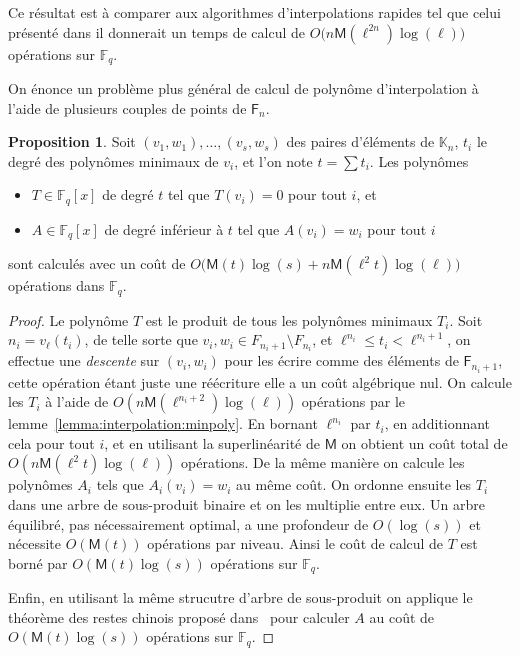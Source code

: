\documentclass[10pt,a4paper]{book}
\theoremstyle{plain}
\theoremstyle{definition}
\theoremstyle{definition}
\theoremstyle{definition}
\newtheorem{prop}[thm]{Proposition}
\theoremstyle{definition}
\theoremstyle{remark}
\theoremstyle{remark}
\theoremstyle{definition}
\begin{document}
 
 Ce résultat est à comparer aux algorithmes d'interpolations rapides 
 tel que  celui présenté dans \cite[Chapter~10.2]{vzGJG03} il donnerait un temps
 de calcul de  $O\bigl(n\mathsf{M}(\ell^{2n})\log(\ell)\bigr)$ opérations sur 
 $\mathbb{F}_q$. 

On énonce un problème plus général de calcul de polynôme d'interpolation 
à l'aide de plusieurs couples de points de $\mathsf{F}_n$.

\begin{prop}\label{prop:interpol}
  Soit $(v_1,w_1),\dots,(v_s,w_s)$ des paires d'éléments de $\mathbb{K}_n$, 
  $t_i$ le degré des polynômes minimaux de $v_i$, et l'on note  $t=\sum t_i$. 
  Les polynômes
  \begin{itemize}
  \item $T\in \mathbb{F}_q[x]$ de degré $t$ tel que $T(v_i)=0$ pour tout $i$,
    et
  \item $A\in \mathbb{F}_q[x]$ de degré inférieur à $t$ tel que $A(v_i)=w_i$ pour
    tout $i$
  \end{itemize}
  sont calculés avec un coût de
  $O\bigl(\mathsf{M}(t)\log(s) + n\mathsf{M}(\ell^2t)\log(\ell)\bigr)$ opérations dans $\mathbb{F}_q$.
\end{prop}
\begin{proof}
  Le polynôme $T$ est le produit de tous les polynômes minimaux $T_i$. Soit 
  $n_i=v_\ell(t_i)$, de telle sorte que $v_i,w_i\in F_{n_i+1}\setminus F_{n_i}$,
  et $\ell^{n_i}\leqslant t_i<\ell^{n_i+1}$,
  on effectue une \emph{descente} sur $(v_i,w_i)$ pour les écrire comme des 
  éléments de $\mathsf{F}_{n_i+1}$, cette opération étant juste une réécriture
  elle a un coût algébrique nul. On calcule les $T_i$ à l'aide de
   $O(n\mathsf{M}(\ell^{n_i+2})\log(\ell))$ opérations par 
   le lemme~\ref{lemma:interpolation:minpoly}. En bornant 
  $\ell^{n_i}$ par $t_i$, en additionnant cela pour tout $i$, et en utilisant 
  la superlinéarité de $\mathsf{M}$ on obtient un coût total de 
  $O(n\mathsf{M}(\ell^2t)\log(\ell))$ opérations.
  De la même manière on calcule les polynômes $A_i$ tels que $A_i(v_i)=w_i$
  au même coût.
  On ordonne ensuite les $T_i$ dans une arbre de sous-produit binaire et 
  on les multiplie entre eux. Un arbre équilibré, pas nécessairement optimal,
  a une profondeur de $O(\log (s))$ et nécessite $O(\mathsf{M}(t))$ opérations
   par niveau. Ainsi le coût de calcul de $T$ est borné par 
   $O(\mathsf{M}(t)\log(s))$ opérations sur $\mathbb{F}_q$.
  
  Enfin, en utilisant la même strucutre d'arbre de sous-produit on applique le 
  théorème des restes chinois proposé dans~\cite[Chapter~10]{vzGJG03} pour 
  calculer $A$ au coût de $O(\mathsf{M}(t)\log(s))$ opérations sur $\mathbb{F}_q$.
\end{proof}
\end{document}
